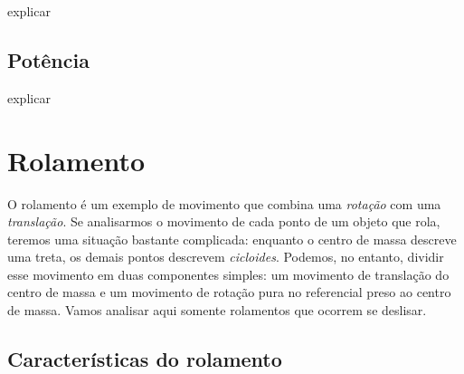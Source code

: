 explicar

\subsection{Potência}

explicar

\section{Rolamento}


O rolamento é um exemplo de movimento que combina uma \emph{rotação} com uma \emph{translação}. Se analisarmos o movimento de cada ponto de um objeto que rola, teremos uma situação bastante complicada: enquanto o centro de massa descreve uma treta, os demais pontos descrevem \emph{cicloides}. Podemos, no entanto, dividir esse movimento em duas componentes simples: um movimento de translação do centro de massa e um movimento de rotação pura no referencial preso ao centro de massa.
Vamos analisar aqui somente rolamentos que ocorrem se deslisar. 

\subsection{Características do rolamento}

